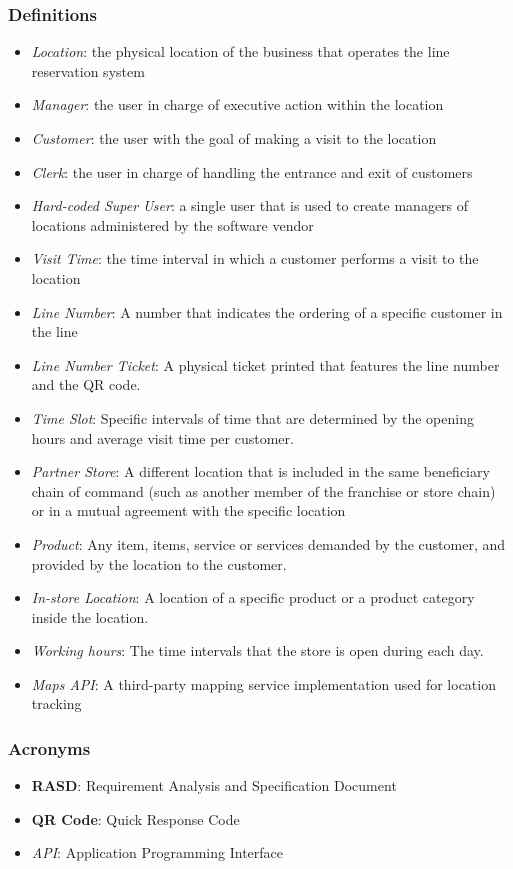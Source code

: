 \subsubsection{Definitions}
\begin{itemize}
    \item \textit{Location}: the physical location of the business that operates the line reservation system
    \item \textit{Manager}: the user in charge of executive action within the location
    \item \textit{Customer}: the user with the goal of making a visit to the location
    \item \textit{Clerk}: the user in charge of handling the entrance and exit of customers
    \item \textit{Hard-coded Super User}: a single user that is used to create managers of locations administered by the software vendor
    \item \textit{Visit Time}: the time interval in which a customer performs a visit to the location
    \item \textit{Line Number}: A number that indicates the ordering of a specific customer in the line
    \item \textit{Line Number Ticket}: A physical ticket printed that features the line number and the QR code.
    \item \textit{Time Slot}: Specific intervals of time that are determined by the opening hours and average visit time per customer.
    \item \textit{Partner Store}: A different location that is included in the same beneficiary chain of command (such as another member of the franchise or store chain) or in a mutual agreement with the specific location
    \item \textit{Product}: Any item, items, service or services demanded by the customer, and provided by the location to the customer.
    \item \textit{In-store Location}: A location of a specific product or a product category inside the location.
    \item \textit{Working hours}: The time intervals that the store is open during each day.
    \item \textit{Maps API}: A third-party mapping service implementation used for location tracking
\end{itemize}
\subsubsection{Acronyms}
\begin{itemize}
    \item \textbf{RASD}: Requirement Analysis and Specification Document
    \item \textbf{QR Code}: Quick Response Code
    \item \textit{API}: Application Programming Interface
\end{itemize}
